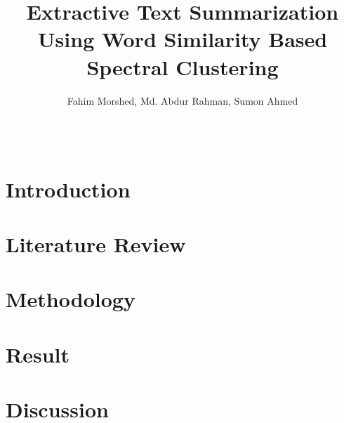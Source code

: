 \documentclass[11pt]{article}
\title{Extractive Text Summarization Using Word Similarity Based Spectral Clustering}
\author{Fahim Morshed, Md. Abdur Rahman, Sumon Ahmed}
\begin{document}
    \maketitle
    \setlength{\parindent}{0pt}
    \begin{abstract}
        \blindtext\\
    \end{abstract}

    \section{Introduction}\label{sec:introduction}
    

    \section{Literature Review}\label{sec:literature-review}
    

    \section{Methodology}\label{sec:methodology}
    

    \section{Result}\label{sec:result}
    

    \section{Discussion}\label{sec:discussion}
    


    
    
\end{document}
